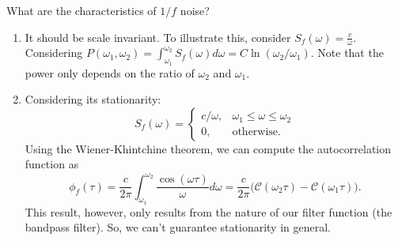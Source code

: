 \documentclass{article}
\begin{document}
What are the characteristics of $ 1/f $ noise?
\begin{enumerate}
   \item It should be scale invariant. To illustrate this, consider $
      S_{f}(\omega) = \frac{c}{\omega} $. Considering $ P(\omega_{1},\omega_{2})
      = \int_{\omega_{1}}^{\omega_{2}} S_{f}(\omega) d\omega = C
      \ln(\omega_{2}/\omega_{1}) $. Note that the power only depends on the
      ratio of $ \omega_{2} $ and $ \omega_{1} $.
   \item Considering its stationarity:
      \[
         S_{f}(\omega) = \begin{cases}
            c/\omega, & \omega_{1} \le \omega \le \omega_{2} \\
            0, & \text{otherwise}.
         \end{cases}
      \]
      Using the Wiener-Khintchine theorem, we can compute the autocorrelation
      function as
      \[
         \phi_{f}(\tau) = \frac{c}{2 \pi} \int_{\omega_{1}}^{\omega_{2}}
         \frac{\cos(\omega \tau)}{\omega} d\omega = \frac{c}{2 \pi}
      \bigl(\mathcal{C}(\omega_{2}\tau) - \mathcal{C}(\omega_{1}\tau)\bigr).
      \]
      This result, however, only results from the nature of our filter function
      (the bandpass filter). So, we can't guarantee stationarity in general.
\end{enumerate}
\end{document}
